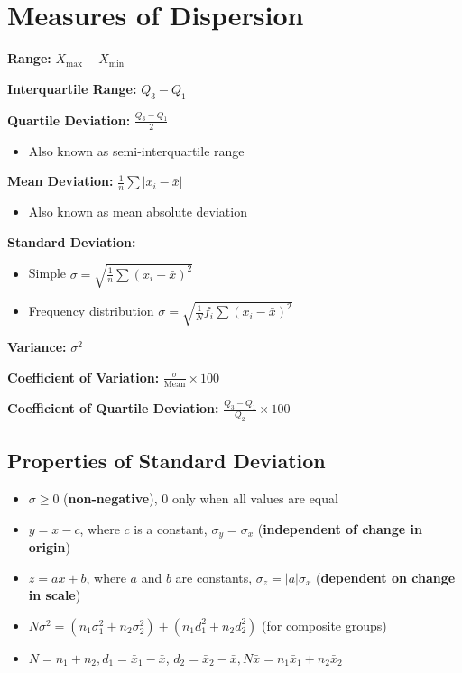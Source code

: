 \section*{Measures of Dispersion}

\textbf{Range:} $X_{\text{max}} - X_{\text{min}}$

\textbf{Interquartile Range:} $Q_3 - Q_1$

\textbf{Quartile Deviation:} $\frac{Q_3 - Q_1}{2}$
\begin{itemize}
    \item Also known as semi-interquartile range
\end{itemize}

\textbf{Mean Deviation:} $\frac{1}{n} \sum |x_i - \bar{x}|$
\begin{itemize}
    \item Also known as mean absolute deviation
\end{itemize}

\textbf{Standard Deviation:}

\begin{itemize}
    \item Simple $\sigma = \sqrt{\frac{1}{n} \sum (x_i - \bar{x})^2}$
    \item Frequency distribution $\sigma = \sqrt{\frac{1}{N} f_i\sum (x_i - \bar{x})^2}$
\end{itemize}


\textbf{Variance:} $\sigma^2$

\textbf{Coefficient of Variation:} $\frac{\sigma}{\text{Mean}} \times 100$

\textbf{Coefficient of Quartile Deviation:} $\frac{Q_3 - Q_1}{Q_2} \times 100$

\subsection*{Properties of Standard Deviation}
\begin{itemize}
    \item $\sigma \geq 0$ (\textbf{non-negative}), $0$ only when all values are equal
    \item $y = x - c$, where $c$ is a constant, $\sigma_y = \sigma_x$
    (\textbf{independent of change in origin})
    \item $z = ax + b$, where $a$ and $b$ are constants, $\sigma_z = |a| \sigma_x$ (\textbf{dependent on change in scale})
    \item $N \sigma^2 = (n_1 \sigma_1^2 + n_2 \sigma_2^2) + (n_1 d_1^2 + n_2 d_2^2) $ (for composite groups)
    \item $N = n_1 + n_2, d_1 = \bar{x}_1 - \bar{x}$, $d_2 = \bar{x}_2 - \bar{x}, N \bar{x} = n_1 \bar{x}_1 + n_2 \bar{x}_2$
\end{itemize}
